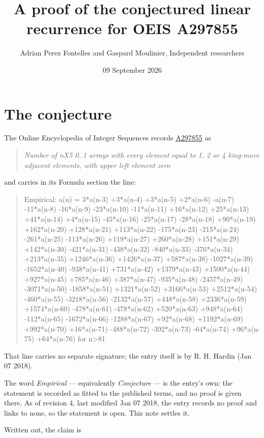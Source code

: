 \documentclass[11pt]{article}
\title{A proof of the conjectured linear recurrence for OEIS A297855}
\author{Adrian Perez Fontelles and Gaspard Moulinier, Independent researchers}
\date{09 September 2026}
\theoremstyle{definition}
\begin{document}
\maketitle
\section{The conjecture}

The Online Encyclopedia of Integer Sequences records \href{https://oeis.org/A297855}{A297855} as

\begin{quote}\itshape Number of nX5 0..1 arrays with every element equal to 1, 2 or 4 king-move adjacent elements, with upper left element zero\end{quote}

and carries in its Formula section the line:

\begin{quote}\ttfamily Empirical: a(n) = 3*a(n-3) +3*a(n-4) +3*a(n-5) +2*a(n-6) -a(n-7) -11*a(n-8) -16*a(n-9) -23*a(n-10) -11*a(n-11) +16*a(n-12) +25*a(n-13) +41*a(n-14) +4*a(n-15) -45*a(n-16) -25*a(n-17) -28*a(n-18) +90*a(n-19) +162*a(n-20) +128*a(n-21) +113*a(n-22) -175*a(n-23) -215*a(n-24) -261*a(n-25) -113*a(n-26) +119*a(n-27) +260*a(n-28) +151*a(n-29) +142*a(n-30) -421*a(n-31) -438*a(n-32) -840*a(n-33) -376*a(n-34) +213*a(n-35) +1246*a(n-36) +1426*a(n-37) +587*a(n-38) -1027*a(n-39) -1652*a(n-40) -938*a(n-41) +731*a(n-42) +1379*a(n-43) +1500*a(n-44) +927*a(n-45) +785*a(n-46) +387*a(n-47) -935*a(n-48) -2457*a(n-49) -3071*a(n-50) -1858*a(n-51) +1321*a(n-52) +3166*a(n-53) +2512*a(n-54) -460*a(n-55) -3218*a(n-56) -2132*a(n-57) +448*a(n-58) +2336*a(n-59) +1574*a(n-60) -478*a(n-61) -478*a(n-62) +520*a(n-63) +948*a(n-64) -112*a(n-65) -1672*a(n-66) -1288*a(n-67) +92*a(n-68) +1192*a(n-69) +992*a(n-70) +16*a(n-71) -488*a(n-72) -392*a(n-73) -64*a(n-74) +96*a(n-75) +64*a(n-76) for n>81\end{quote}

That line carries no separate signature; the entry itself is by R. H. Hardin (Jan 07 2018).

The word {\itshape Empirical} --- equivalently {\itshape Conjecture} --- is the entry's own: the statement is recorded as fitted to the published terms, and no proof is given there. As of revision 4, last modified Jan 07 2018, the entry records no proof and links to none, so the statement is open. This note settles it.

Written out, the claim is
\end{document}
